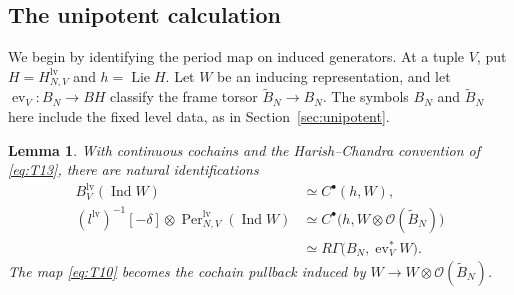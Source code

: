 \documentclass[11pt]{article}
\numberwithin{equation}{section}
\newtheorem{lemma}[theorem]{Lemma}
\theoremstyle{definition}
\theoremstyle{remark}
\begin{document}
\subsection{The unipotent calculation}

We begin by identifying the period map on induced generators.  At a tuple
$V$, put $H=H_{N,V}^{\mathrm{lv}}$ and $h=\operatorname{Lie}H$.  Let $W$ be
an inducing representation, and let
$\operatorname{ev}_V:B_N\to BH$ classify the frame torsor
$\widetilde B_N\to B_N$.  The symbols $B_N$ and $\widetilde B_N$ here
include the fixed level data, as in Section~\ref{sec:unipotent}.

\begin{lemma}\label{lem:ran-shapiro}
With continuous cochains and the Harish--Chandra convention of
\eqref{eq:T13}, there are natural identifications
\begin{equation}\label{eq:T19}
\begin{aligned}
 B_V^{\mathrm{lv}}(\operatorname{Ind}W)
   &\simeq C^\bullet(h,W),\\
 (l^{\mathrm{lv}})^{-1}[-\delta]\otimes
       \operatorname{Per}_{N,V}^{\mathrm{lv}}(\operatorname{Ind}W)
   &\simeq C^\bullet\bigl(h,W\otimes
                                  \mathcal O(\widetilde B_N)\bigr)\\
   &\simeq R\Gamma\bigl(B_N,\operatorname{ev}_V^*W\bigr).
\end{aligned}
\end{equation}
The map \eqref{eq:T10} becomes the cochain pullback induced by
$W\to W\otimes\mathcal O(\widetilde B_N)$.
\end{lemma}
\end{document}
